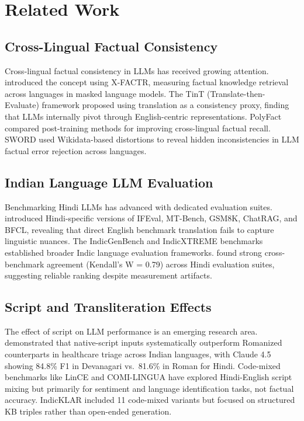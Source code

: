 \documentclass[11pt,a4paper]{article}
\begin{document}
\section{Related Work}
\label{sec:related}

\subsection{Cross-Lingual Factual Consistency}
Cross-lingual factual consistency in LLMs has received growing attention. \citet{qi2023crosslingual} introduced the concept using X-FACTR, measuring factual knowledge retrieval across languages in masked language models. The TinT (Translate-then-Evaluate) framework \citep{tint2025} proposed using translation as a consistency proxy, finding that LLMs internally pivot through English-centric representations. PolyFact \citep{polyfact2026} compared post-training methods for improving cross-lingual factual recall. SWORD \citep{sword2026} used Wikidata-based distortions to reveal hidden inconsistencies in LLM factual error rejection across languages.

\subsection{Indian Language LLM Evaluation}
Benchmarking Hindi LLMs has advanced with dedicated evaluation suites. \citet{kamath2025benchmarking} introduced Hindi-specific versions of IFEval, MT-Bench, GSM8K, ChatRAG, and BFCL, revealing that direct English benchmark translation fails to capture linguistic nuances. The IndicGenBench \citep{indicgenbench2024} and IndicXTREME benchmarks established broader Indic language evaluation frameworks. \citet{kumar2026hindibenchmarks} found strong cross-benchmark agreement (Kendall's W = 0.79) across Hindi evaluation suites, suggesting reliable ranking despite measurement artifacts.

\subsection{Script and Transliteration Effects}
The effect of script on LLM performance is an emerging research area. \citet{scriptgap2025} demonstrated that native-script inputs systematically outperform Romanized counterparts in healthcare triage across Indian languages, with Claude 4.5 showing 84.8\% F1 in Devanagari vs.\ 81.6\% in Roman for Hindi. Code-mixed benchmarks like LinCE and COMI-LINGUA have explored Hindi-English script mixing but primarily for sentiment and language identification tasks, not factual accuracy. IndicKLAR \citep{indicklar2026} included 11 code-mixed variants but focused on structured KB triples rather than open-ended generation.
\end{document}
